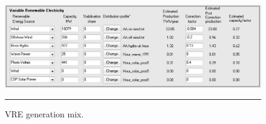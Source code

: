 \begin{figure}[htbp]
	\centering
	\includegraphics[width=\textwidth]{figures/B02_VRE.png}
	\rule{\textwidth}{0.5pt} %
	\caption{VRE generation mix.}
	\label{fig:B02-VRE}
\end{figure}